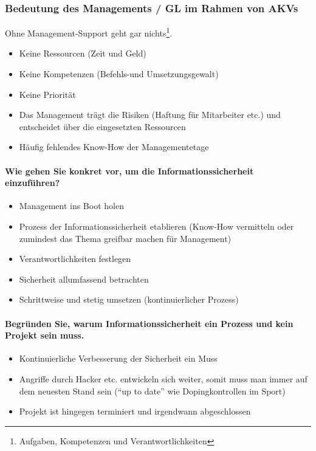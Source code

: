 \documentclass[10pt,a4paper]{article}
\begin{document}
\subsubsection*{Bedeutung des Managements / GL im Rahmen von AKVs}
Ohne Management-Support geht gar nichts\footnote{Aufgaben, Kompetenzen und Verantwortlichkeiten}.
\begin{itemize}[noitemsep,topsep=0pt,leftmargin=*]
    \item Keine Ressourcen (Zeit und Geld)
    \item Keine Kompetenzen (Befehls-und Umsetzungsgewalt)
    \item Keine Priorität
    \item Das Management trägt die Risiken (Haftung für Mitarbeiter etc.) und entscheidet über die eingesetzten Ressourcen
    \item Häufig fehlendes Know-How der Managementetage
\end{itemize}

\paragraph*{Wie gehen Sie konkret vor, um die Informationssicherheit einzuführen?}
\begin{itemize}[noitemsep,topsep=0pt,leftmargin=*]
    \item Management ins Boot holen
    \item Prozess der Informationssicherheit etablieren (Know-How vermitteln oder zumindest das Thema greifbar machen für Management)
    \item Verantwortlichkeiten festlegen
    \item Sicherheit allumfassend betrachten
    \item Schrittweise und stetig umsetzen (kontinuierlicher Prozess)
\end{itemize}

\paragraph*{Begründen Sie, warum Informationssicherheit ein Prozess und kein Projekt sein muss.}
\begin{itemize}[noitemsep,topsep=0pt,leftmargin=*]
    \item Kontinuierliche Verbesserung der Sicherheit ein Muss
    \item Angriffe durch Hacker etc. entwickeln sich weiter, somit muss man immer auf dem neuesten Stand sein ("`up to date"' wie Dopingkontrollen im Sport)
    \item Projekt ist hingegen terminiert und irgendwann abgeschlossen
\end{itemize}
\end{document}
